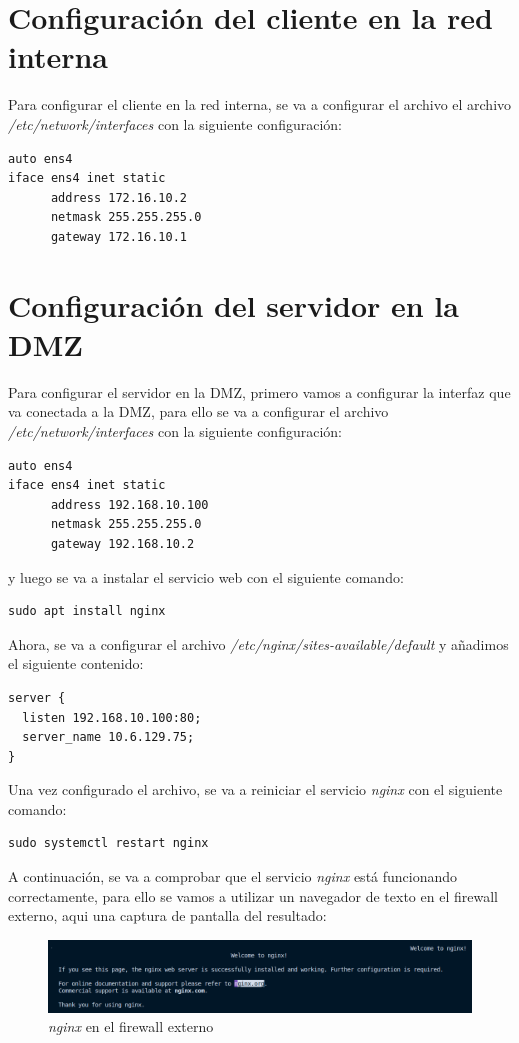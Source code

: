 \documentclass[11pt]{report}
\begin{document}
\section{Configuración del cliente en la red interna}
Para configurar el cliente en la red interna, se va a configurar el archivo el archivo \emph{/etc/network/interfaces}
con la siguiente configuración:
\begin{verbatim}
auto ens4
iface ens4 inet static
      address 172.16.10.2
      netmask 255.255.255.0
      gateway 172.16.10.1
\end{verbatim}

\section{Configuración del servidor en la DMZ}
Para configurar el servidor en la DMZ, primero vamos a configurar la interfaz que va conectada a la DMZ, para ello se va a configurar el archivo \emph{/etc/network/interfaces}
con la siguiente configuración:
\begin{verbatim}
auto ens4
iface ens4 inet static
      address 192.168.10.100
      netmask 255.255.255.0
      gateway 192.168.10.2
\end{verbatim}

y luego se va a instalar el servicio web con el siguiente comando:
\begin{BVerbatim}
sudo apt install nginx
\end{BVerbatim}

Ahora, se va a configurar el archivo \emph{/etc/nginx/sites-available/default} y añadimos
el siguiente contenido:
\begin{verbatim}
server {
  listen 192.168.10.100:80;
  server_name 10.6.129.75;
}
\end{verbatim}

Una vez configurado el archivo, se va a reiniciar el servicio \emph{nginx} con el siguiente comando: \\
\begin{BVerbatim}
sudo systemctl restart nginx
\end{BVerbatim}

A continuación, se va a comprobar que el servicio \emph{nginx} está funcionando correctamente, para ello se vamos a utilizar un navegador de texto 
en el firewall externo, aqui una captura de pantalla del resultado:
\begin{figure}[H]
  \centering
  \includegraphics[scale=0.55]{img/nginx_fw_externo.png}
  \caption{\emph{nginx} en el firewall externo}
  \label{fig:nginx en el firewall externo}
\end{figure}
\end{document}
